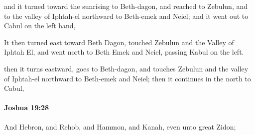 			\begin{versebox}
					\item[BHS] 
					\item[ASV] and it turned toward the sunrising to Beth-dagon, and reached to Zebulun, and to the valley of Iphtah-el northward to Beth-emek and Neiel; and it went out to Cabul on the left hand,
					\item[NIV] It then turned east toward Beth Dagon, touched Zebulun and the Valley of Iphtah El, and went north to Beth Emek and Neiel, passing Kabul on the left.
					\item[NRSV] then it turns eastward, goes to Beth-dagon, and touches Zebulun and the valley of Iphtah-el northward to Beth-emek and Neiel; then it continues in the north to Cabul,
			\end{versebox}

		\paragraph{Joshua 19:28} %
			\label{JOSHUA-19-28}

			And Hebron, and Rehob, and Hammon, and Kanah, even unto great Zidon;

